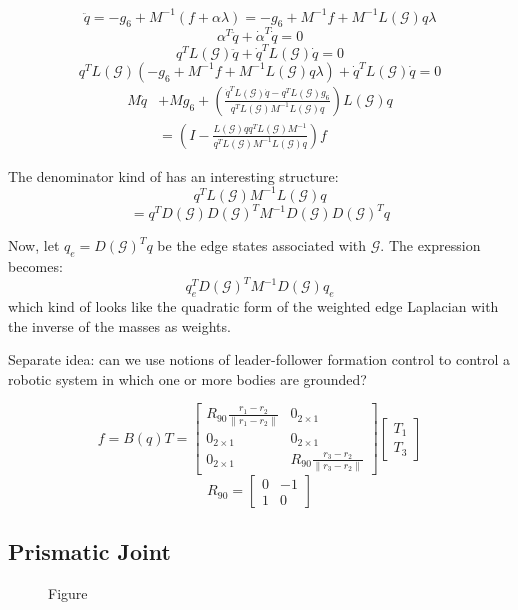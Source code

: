 \documentclass[conference]{IEEEtran}
\begin{document}
$$\ddot{q}=-g_6+M^{-1}(f+\alpha\lambda)=-g_6+M^{-1}f+M^{-1}L(\mathcal{G})q\lambda$$
$$\alpha^T\ddot{q}+\dot{\alpha}^T\dot{q}=0$$
$$q^TL(\mathcal{G})\ddot{q}+\dot{q}^TL(\mathcal{G})\dot{q}=0$$
$$q^TL(\mathcal{G})(-g_6+M^{-1}f+M^{-1}L(\mathcal{G})q\lambda)+\dot{q}^TL(\mathcal{G})\dot{q}=0$$
\begin{align*}
    M\ddot{q}&+Mg_6+\left(\frac{\dot{q}^TL(\mathcal{G})\dot{q}-q^TL(\mathcal{G})g_6}{q^TL(\mathcal{G})M^{-1}L(\mathcal{G})q}\right)L(\mathcal{G})q\\
    &=\left(I-\frac{L(\mathcal{G})qq^TL(\mathcal{G})M^{-1}}{q^TL(\mathcal{G})M^{-1}L(\mathcal{G})q}\right)f
\end{align*}

The denominator kind of has an interesting structure:
$$q^TL(\mathcal{G})M^{-1}L(\mathcal{G})q$$
$$=q^TD(\mathcal{G})D(\mathcal{G})^TM^{-1}D(\mathcal{G})D(\mathcal{G})^Tq$$

Now, let $q_e=D(\mathcal{G})^Tq$ be the edge states associated with $\mathcal{G}$. The expression becomes:
$$q_e^TD(\mathcal{G})^TM^{-1}D(\mathcal{G})q_e$$
which kind of looks like the quadratic form of the weighted edge Laplacian with the inverse of the masses as weights.

Separate idea: can we use notions of leader-follower formation control to control a robotic system in which one or more bodies are grounded?

$$f=B(q)T=\begin{bmatrix}
    R_{90}\frac{r_1-r_2}{\|r_1-r_2\|} & 0_{2\times1}\\
    0_{2\times1} & 0_{2\times1}\\
    0_{2\times1} & R_{90}\frac{r_3-r_2}{\|r_3-r_2\|}
\end{bmatrix}\begin{bmatrix}
    T_1\\T_3
\end{bmatrix}$$
$$R_{90}=\begin{bmatrix}
    0 & -1\\ 1 & 0
\end{bmatrix}$$

\subsection{Prismatic Joint}
\begin{figure}[htbp]
    \centering
    \caption{Figure}
    \label{fig:over2}
\end{figure}
\end{document}

